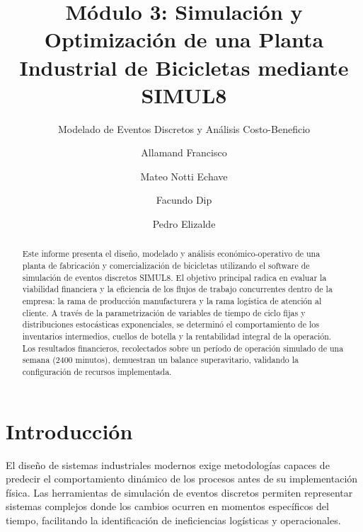 \documentclass[runningheads]{llncs}
\begin{document}
\title{Módulo 3: Simulación y Optimización de una Planta Industrial de Bicicletas mediante SIMUL8}
\subtitle{Modelado de Eventos Discretos y Análisis Costo-Beneficio}

\author{Allamand Francisco \and
Mateo Notti Echave \and
Facundo Dip \and
Pedro Elizalde}



\maketitle

\begin{abstract}
Este informe presenta el diseño, modelado y análisis económico-operativo de una planta de fabricación y comercialización de bicicletas utilizando el software de simulación de eventos discretos SIMUL8. El objetivo principal radica en evaluar la viabilidad financiera y la eficiencia de los flujos de trabajo concurrentes dentro de la empresa: la rama de producción manufacturera y la rama logística de atención al cliente. A través de la parametrización de variables de tiempo de ciclo fijas y distribuciones estocásticas exponenciales, se determinó el comportamiento de los inventarios intermedios, cuellos de botella y la rentabilidad integral de la operación. Los resultados financieros, recolectados sobre un período de operación simulado de una semana (2400 minutos), demuestran un balance superavitario, validando la configuración de recursos implementada.

\end{abstract}

\section{Introducción}
El diseño de sistemas industriales modernos exige metodologías capaces de predecir el comportamiento dinámico de los procesos antes de su implementación física. Las herramientas de simulación de eventos discretos permiten representar sistemas complejos donde los cambios ocurren en momentos específicos del tiempo, facilitando la identificación de ineficiencias logísticas y operacionales.
\end{document}
